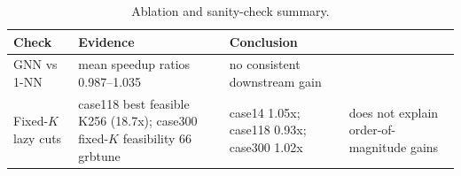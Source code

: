 \begin{table}[t]\centering
\caption{Ablation and sanity-check summary.}
\label{tab:ablation_sanity}
\small
\begin{tabularx}{\linewidth}{|l|X|X|}
\hline
\textbf{Check} & \textbf{Evidence} & \textbf{Conclusion} \\
\hline
GNN vs 1-NN & mean speedup ratios 0.987--1.035 & no consistent downstream gain \\
Fixed-$K$ lazy cuts & case118 best feasible K256 (18.7x); case300 fixed-$K$ feasibility 66%
grbtune & case14 1.05x; case118 0.93x; case300 1.02x & does not explain order-of-magnitude gains \\
\hline
\end{tabularx}
\end{table}
